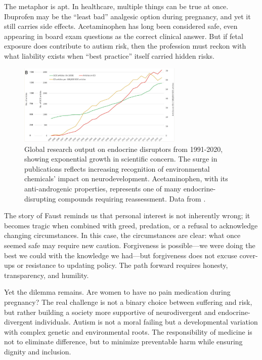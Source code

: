 \documentclass[11pt]{article}
\begin{document}
The metaphor is apt. In healthcare, multiple things can be true at once. Ibuprofen may be the ``least bad'' analgesic option during pregnancy, and yet it still carries side effects. Acetaminophen has long been considered safe, even appearing in board exam questions as the correct clinical answer. But if fetal exposure does contribute to autism risk, then the profession must reckon with what liability exists when ``best practice'' itself carried hidden risks.

\begin{figure}[h]
\centering
\includegraphics[width=0.7\textwidth]{../assets/endocrine-disruption-publications.png}
\caption{Global research output on endocrine disruptors from 1991-2020, showing exponential growth in scientific concern. The surge in publications reflects increasing recognition of environmental chemicals' impact on neurodevelopment. Acetaminophen, with its anti-androgenic properties, represents one of many endocrine-disrupting compounds requiring reassessment. Data from \citep{klingelhofer2025}.}
\label{fig:edpublications}
\end{figure}

The story of Faust reminds us that personal interest is not inherently wrong; it becomes tragic when combined with greed, predation, or a refusal to acknowledge changing circumstances. In this case, the circumstances are clear: what once seemed safe may require new caution. Forgiveness is possible---we were doing the best we could with the knowledge we had---but forgiveness does not excuse cover-ups or resistance to updating policy. The path forward requires honesty, transparency, and humility.

Yet the dilemma remains. Are women to have no pain medication during pregnancy? The real challenge is not a binary choice between suffering and risk, but rather building a society more supportive of neurodivergent and endocrine-divergent individuals. Autism is not a moral failing but a developmental variation with complex genetic and environmental roots. The responsibility of medicine is not to eliminate difference, but to minimize preventable harm while ensuring dignity and inclusion.
\end{document}
